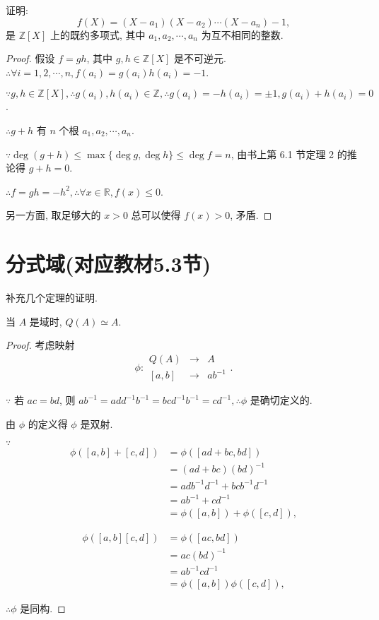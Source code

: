 \documentclass[UTF8]{ctexart}
\begin{document}
\begin{example}
    证明:
    \[f(X)=(X-a_1)(X-a_2)\cdots(X-a_n)-1,\]
    是 $\mathbb{Z}[X]$ 上的既约多项式, 其中 $a_1,a_2,\cdots,a_n$ 为互不相同的整数.
\end{example}
\begin{proof}
    假设 $f=gh$, 其中 $g,h\in\mathbb{Z}[X]$ 是不可逆元. $\therefore\forall i=1,2,\cdots,n,f(a_i)=g(a_i)h(a_i)=-1$.

    $\because g,h\in\mathbb{Z}[X],\therefore g(a_i),h(a_i)\in\mathbb{Z},\therefore g(a_i)=-h(a_i)=\pm 1,g(a_i)+h(a_i)=0$.

    $\therefore g+h$ 有 $n$ 个根 $a_1,a_2,\cdots,a_n$.

    $\because\deg(g+h)\leq\max\{\deg g,\deg h\}\leq\deg f=n$, 由书上第 6.1 节定理 2 的推论得 $g+h=0$.

    $\therefore f=gh=-h^2,\therefore\forall x\in\mathbb{R},f(x)\leq0$.

    另一方面, 取足够大的 $x>0$ 总可以使得 $f(x)>0$, 矛盾.
\end{proof}
\section{分式域(对应教材5.3节)}
补充几个定理的证明.
\begin{theorem}\label{t4.1}
    当 $A$ 是域时, $Q(A)\simeq A$.
\end{theorem}
\begin{proof}
    考虑映射
    \[\phi:\begin{array}{rcl}
        Q(A) & \to & A \\[3pt]
        [a,b] & \to & ab^{-1}
    \end{array}.\]

    $\because$ 若 $ac=bd$, 则 $ab^{-1}=add^{-1}b^{-1}=bcd^{-1}b^{-1}=cd^{-1},\therefore\phi$ 是确切定义的.

    由 $\phi$ 的定义得 $\phi$ 是双射.

    $\because$
    \begin{align*}
        \phi([a,b]+[c,d]) & =\phi([ad+bc,bd]) \\
        & =(ad+bc)(bd)^{-1} \\
        & =adb^{-1}d^{-1}+bcb^{-1}d^{-1} \\
        & =ab^{-1}+cd^{-1} \\
        & =\phi([a,b])+\phi([c,d]),
    \end{align*}
    
    \begin{align*}
        \phi([a,b][c,d]) & =\phi([ac,bd]) \\
        & =ac(bd)^{-1} \\
        & =ab^{-1}cd^{-1} \\
        & =\phi([a,b])\phi([c,d]),
    \end{align*}

    $\therefore\phi$ 是同构.
\end{proof}
\end{document}
